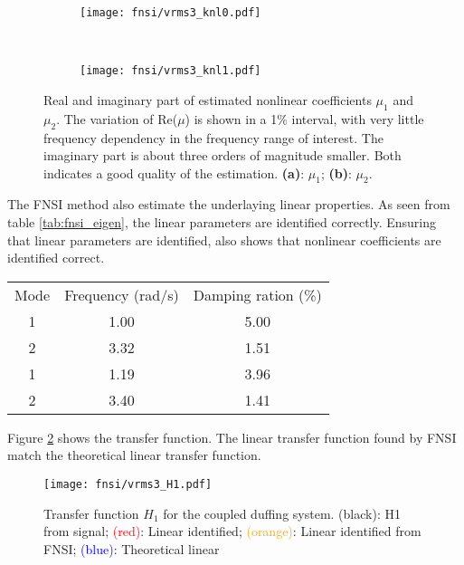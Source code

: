 \begin{figure}[!ht]
  \centering
  \begin{subfigure}[b]{0.45\textwidth}
    \texttt{[image: fnsi/vrms3\_knl0.pdf]}
    \caption{}
  \end{subfigure}
  ~
  \begin{subfigure}[b]{0.45\textwidth}
    \texttt{[image: fnsi/vrms3\_knl1.pdf]}
    \caption{}
  \end{subfigure}
  \caption{Real and imaginary part of estimated nonlinear coefficients $\mu_1$
    and $\mu_2$. The variation of Re($\mu$) is shown in a 1\% interval, with
    very little frequency dependency in the frequency range of interest.
    The imaginary part is about three orders of magnitude smaller. Both
    indicates a good quality of the estimation.
    \textbf{(a)}: $\mu_1$;
    \textbf{(b)}: $\mu_2$.
  }
  \label{fig:fnsi_knl}
\end{figure}

The FNSI method also estimate the underlaying linear properties. As seen from
table \ref{tab:fnsi_eigen}, the linear parameters are identified correctly.
Ensuring that linear parameters are identified, also shows that nonlinear
coefficients are identified correct.

\begin{center}
  \begin{tabular}{*{3}{c}}
    \hline
    Mode & Frequency (rad/s) & Damping ration (\%) \\
    1 & 1.00 & 5.00 \\
    2 & 3.32 & 1.51 \\
    \hline
    1 & 1.19 & 3.96 \\
    2 & 3.40 & 1.41 \\
    \hline
  \end{tabular}
  \label{tab:fnsi_eigen}
\end{center}

Figure \ref{fig:fnsi_H1} shows the transfer function. The linear transfer
function found by FNSI match the theoretical linear transfer function.

\begin{figure}[!ht]
  \centering
  \texttt{[image: fnsi/vrms3\_H1.pdf]}
  \caption{Transfer function $H_1$ for the coupled duffing system.
    \sampleline{}(black): H1 from signal;
    \textcolor{red}{(red)}: Linear identified;
    \textcolor{orange}{(orange)}: Linear identified from FNSI;
    \textcolor{blue}{(blue)}: Theoretical linear
  }
  \label{fig:fnsi_H1}
\end{figure}

